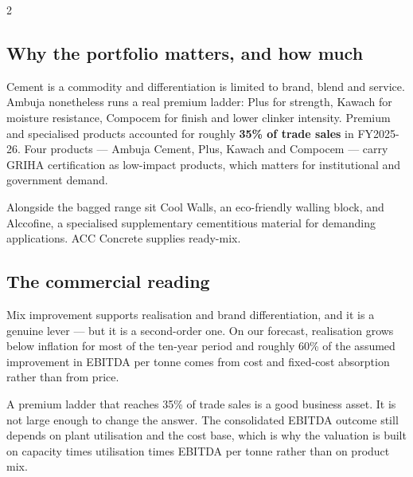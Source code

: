 \vspace{6mm}
\begin{paracol}{2}
\subsection*{Why the portfolio matters, and how much}

Cement is a commodity and differentiation is limited to brand, blend and service.
Ambuja nonetheless runs a real premium ladder: Plus for strength, Kawach for moisture
resistance, Compocem for finish and lower clinker intensity. Premium and specialised
products accounted for roughly \textbf{35\% of trade sales} in FY2025-26. Four
products — Ambuja Cement, Plus, Kawach and Compocem — carry GRIHA certification as
low-impact products, which matters for institutional and government demand.

Alongside the bagged range sit Cool Walls, an eco-friendly walling block, and
Alccofine, a specialised supplementary cementitious material for demanding
applications. ACC Concrete supplies ready-mix.

\switchcolumn
\subsection*{The commercial reading}

Mix improvement supports realisation and brand differentiation, and it is a genuine
lever — but it is a second-order one. On our forecast, realisation grows below
inflation for most of the ten-year period and roughly 60\% of the assumed improvement
in EBITDA per tonne comes from cost and fixed-cost absorption rather than from price.

\begin{okbox}
A premium ladder that reaches 35\% of trade sales is a good business asset. It is not
large enough to change the answer. The consolidated EBITDA outcome still depends on
plant utilisation and the cost base, which is why the valuation is built on capacity
times utilisation times EBITDA per tonne rather than on product mix.
\end{okbox}
\end{paracol}
\clearpage
